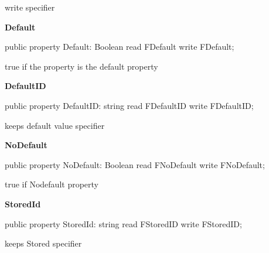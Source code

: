 \documentclass{report}
\newif\ifpdf
\begin{document}
\begin{list}{}
\par write specifier\label{PasDoc_Items.TPasProperty-Default}
\item[\textbf{Default}\hfill]
\ifpdf
\begin{flushleft}
\fi
\begin{ttfamily}
public property Default: Boolean read FDefault write FDefault;\end{ttfamily}

\ifpdf
\end{flushleft}
\fi


\par true if the property is the default property\label{PasDoc_Items.TPasProperty-DefaultID}
\item[\textbf{DefaultID}\hfill]
\ifpdf
\begin{flushleft}
\fi
\begin{ttfamily}
public property DefaultID: string read FDefaultID write FDefaultID;\end{ttfamily}

\ifpdf
\end{flushleft}
\fi


\par keeps default value specifier\label{PasDoc_Items.TPasProperty-NoDefault}
\item[\textbf{NoDefault}\hfill]
\ifpdf
\begin{flushleft}
\fi
\begin{ttfamily}
public property NoDefault: Boolean read FNoDefault write FNoDefault;\end{ttfamily}

\ifpdf
\end{flushleft}
\fi


\par true if Nodefault property\label{PasDoc_Items.TPasProperty-StoredId}
\item[\textbf{StoredId}\hfill]
\ifpdf
\begin{flushleft}
\fi
\begin{ttfamily}
public property StoredId: string read FStoredID write FStoredID;\end{ttfamily}

\ifpdf
\end{flushleft}
\fi


\par keeps Stored specifier\end{list}
\end{document}
